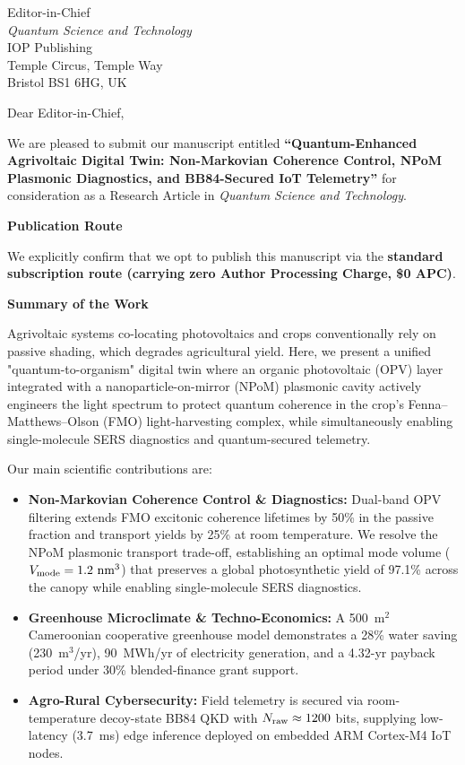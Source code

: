 \documentclass[12pt]{letter}
\begin{document}
\begin{letter}{Editor-in-Chief\\
\textit{Quantum Science and Technology}\\
IOP Publishing\\
Temple Circus, Temple Way\\
Bristol BS1 6HG, UK}

\opening{Dear Editor-in-Chief,}

We are pleased to submit our manuscript entitled \textbf{``Quantum-Enhanced Agrivoltaic Digital Twin: Non-Markovian Coherence Control, NPoM Plasmonic Diagnostics, and BB84-Secured IoT Telemetry''} for consideration as a Research Article in \textit{Quantum Science and Technology}.

\noindent\textbf{Publication Route}

\noindent We explicitly confirm that we opt to publish this manuscript via the \textbf{standard subscription route (carrying zero Author Processing Charge, \$0 APC)}.

\vspace{0.5em}
\noindent\textbf{Summary of the Work}

\noindent Agrivoltaic systems co-locating photovoltaics and crops conventionally rely on passive shading, which degrades agricultural yield. Here, we present a unified "quantum-to-organism" digital twin where an organic photovoltaic (OPV) layer integrated with a nanoparticle-on-mirror (NPoM) plasmonic cavity actively engineers the light spectrum to protect quantum coherence in the crop's Fenna--Matthews--Olson (FMO) light-harvesting complex, while simultaneously enabling single-molecule SERS diagnostics and quantum-secured telemetry.

\noindent Our main scientific contributions are:
\begin{itemize}[nosep]
\item \textbf{Non-Markovian Coherence Control \& Diagnostics:} Dual-band OPV filtering extends FMO excitonic coherence lifetimes by 50\% in the passive fraction and transport yields by 25\% at room temperature. We resolve the NPoM plasmonic transport trade-off, establishing an optimal mode volume ($V_{\rm mode} = 1.2\text{ nm}^3$) that preserves a global photosynthetic yield of 97.1\% across the canopy while enabling single-molecule SERS diagnostics.
\item \textbf{Greenhouse Microclimate \& Techno-Economics:} A 500~m$^2$ Cameroonian cooperative greenhouse model demonstrates a 28\% water saving (230~m$^3$/yr), 90~MWh/yr of electricity generation, and a 4.32-yr payback period under 30\% blended-finance grant support.
\item \textbf{Agro-Rural Cybersecurity:} Field telemetry is secured via room-temperature decoy-state BB84 QKD with $N_{\rm raw} \approx 1200$ bits, supplying low-latency (3.7~ms) edge inference deployed on embedded ARM Cortex-M4 IoT nodes.
\end{itemize}


\end{letter}
\end{document}
